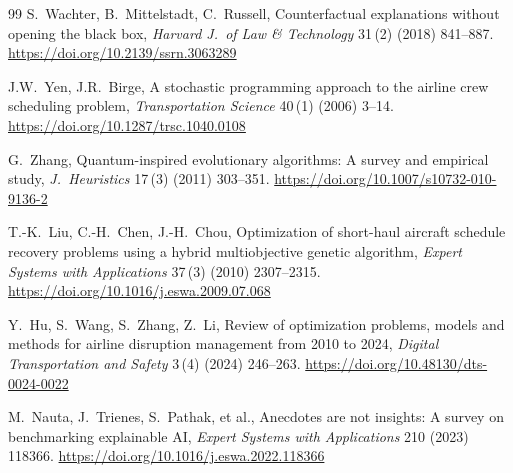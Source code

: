 \documentclass[12pt,number]{elsarticle}
\begin{document}
\begin{thebibliography}{99}
 S.~Wachter, B.~Mittelstadt, C.~Russell, Counterfactual explanations without opening the black box, \textit{Harvard J.\ of Law \& Technology} 31\,(2) (2018) 841--887. \url{https://doi.org/10.2139/ssrn.3063289}

 J.W.~Yen, J.R.~Birge, A stochastic programming approach to the airline crew scheduling problem, \textit{Transportation Science} 40\,(1) (2006) 3--14. \url{https://doi.org/10.1287/trsc.1040.0108}

 G.~Zhang, Quantum-inspired evolutionary algorithms: A survey and empirical study, \textit{J.\ Heuristics} 17\,(3) (2011) 303--351. \url{https://doi.org/10.1007/s10732-010-9136-2}

 T.-K.~Liu, C.-H.~Chen, J.-H.~Chou, Optimization of short-haul aircraft schedule recovery problems using a hybrid multiobjective genetic algorithm, \textit{Expert Systems with Applications} 37\,(3) (2010) 2307--2315. \url{https://doi.org/10.1016/j.eswa.2009.07.068}

 Y.~Hu, S.~Wang, S.~Zhang, Z.~Li, Review of optimization problems, models and methods for airline disruption management from 2010 to 2024, \textit{Digital Transportation and Safety} 3\,(4) (2024) 246--263. \url{https://doi.org/10.48130/dts-0024-0022}

 M.~Nauta, J.~Trienes, S.~Pathak, et al., Anecdotes are not insights: A survey on benchmarking explainable AI, \textit{Expert Systems with Applications} 210 (2023) 118366. \url{https://doi.org/10.1016/j.eswa.2022.118366}

\end{thebibliography}
\end{document}
